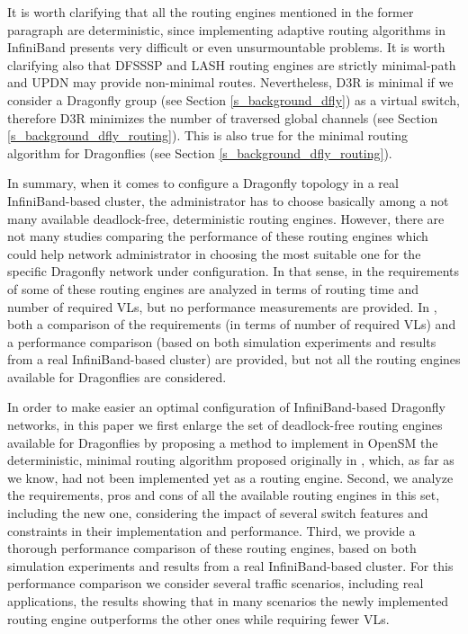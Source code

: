 \documentclass[review]{elsarticle}
\newcommand{\dflys}{Dragonflies}
\newcommand{\dfly}{Dragonfly}
\newcommand{\ibl}{InfiniBand}
\begin{document}
It is worth clarifying that all the routing engines mentioned in the former paragraph are deterministic, since implementing adaptive routing algorithms in
\ibl{} presents very difficult or even unsurmountable problems.
It is worth clarifying also that
DFSSSP and LASH routing engines are strictly minimal-path and UPDN may provide non-minimal routes.
Nevertheless, D3R is minimal if we consider a \dfly{} group (see Section \ref{s_background_dfly}) as a virtual switch,
therefore D3R minimizes the number of traversed global channels (see Section \ref{s_background_dfly_routing}).
This is also true for the minimal routing algorithm for \dflys{} \cite{kim_technology-driven_2008} (see Section \ref{s_background_dfly_routing}).

In summary, when it comes to configure a \dfly{} topology in a real \ibl-based cluster, the administrator has to choose basically among a not many available deadlock-free,
deterministic routing engines.
However, there are not many studies comparing the performance of these routing engines which could help network administrator in choosing the most suitable one for the specific \dfly{} network under configuration.
In that sense, in \cite{schneider2016_dfdn} the requirements of some of these routing engines are analyzed in terms of routing time and number of required VLs, but no performance measurements are provided.
In \cite{maglione2018_d3r}, both a comparison of the requirements (in terms of number of required VLs) and a performance comparison (based on both simulation experiments and results
from a real \ibl-based cluster) are provided, but not all the routing engines available for \dflys{} are considered.

In order to make easier an optimal configuration of \ibl-based \dfly{} networks, in this paper we first enlarge the set of deadlock-free routing engines available for \dflys{} by proposing a method to implement in
OpenSM the deterministic, minimal routing algorithm proposed originally in \cite{kim_technology-driven_2008}, which, as far as we know, had not been implemented yet as a routing engine.
Second, we analyze the requirements, pros and cons of all the available routing engines in this set, including the new one, considering the impact of several
switch features and constraints in their implementation and performance.
Third, we provide a thorough performance comparison of these routing engines, based on both simulation experiments and results from a real \ibl-based cluster.
For this performance comparison we consider several traffic scenarios, including real applications, the results showing that in many scenarios
the newly implemented routing engine outperforms the other ones while requiring fewer VLs.
\end{document}
